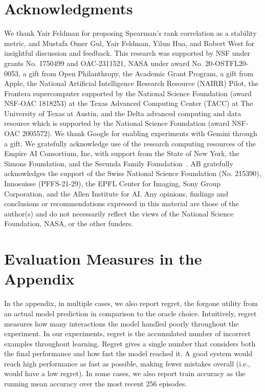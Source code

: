 \documentclass{article}
\theoremstyle{plain}
\theoremstyle{definition}
\theoremstyle{remark}
\newcommand{\gemini}{Gemini\xspace}
\begin{document}
\section*{{Acknowledgments}}
We thank Yair Feldman for proposing Spearman's rank correlation as a stability metric, and Mustafa Omer Gul, Yair Feldman, Yilun Hua, and Robert West for insightful discussion and feedback.
This research was supported by NSF under grants No. 1750499 and OAC-2311521, NASA under award No. 20-OSTFL20-0053, a gift from Open Philanthropy, the Academic Grant Program, a gift from Apple, the National Artificial Intelligence Research Resource (NAIRR) Pilot, the Frontera supercomputer supported by the National Science Foundation (award NSF-OAC 1818253) at the Texas Advanced Computing Center (TACC) at The University of Texas at Austin, and the Delta advanced computing and data resource which is supported by the National Science Foundation (award NSF-OAC 2005572). We thank Google for enabling experiments with \gemini through a gift.
We gratefully acknowledge use of the research computing resources of the Empire AI Consortium, Inc, with support from the State of New York, the Simons Foundation, and the Secunda Family Foundation~\citep{Bloom2025EmpireAI}.
AB gratefully acknowledges the support of the Swiss National Science Foundation (No. 215390), Innosuisse (PFFS-21-29), the EPFL Center for Imaging, Sony Group Corporation, and the Allen Institute for AI.
Any opinions, findings and conclusions or recommendations expressed in this material are those of the author(s) and do not necessarily reflect the views of the National Science Foundation, NASA, or the other funders.


\newpage
\onecolumn
\appendix
\newcommand{\boxcomment}[1]{\textcolor{blue}{\emph{\dotfill(#1)}}}
\section{Evaluation Measures in the Appendix}
In the appendix, in multiple cases, we also report regret, the forgone utility from an actual model prediction in comparison to the oracle choice.
Intuitively, regret measures how many interactions the model handled poorly throughout the experiment.
In our experiments, regret is the accumulated number of incorrect examples throughout learning.
Regret gives a single number that considers both the final performance and how fast the model reached it.
A good system would reach high performance as fast as possible, making fewer mistakes overall (i.e., would have a low regret).
In some cases, we also report train accuracy as the running mean accuracy over the most recent 256 episodes.
\end{document}
